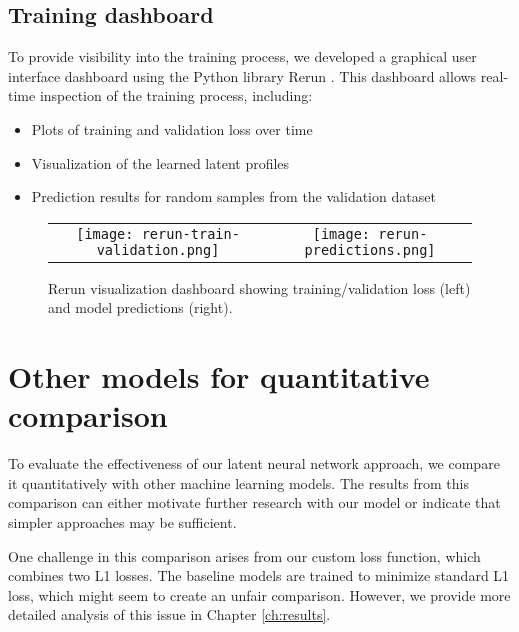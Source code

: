 \subsection{Training dashboard}

To provide visibility into the training process, we developed a graphical user interface dashboard using the Python library Rerun . This dashboard allows real-time inspection of the training process, including:

\begin{itemize}
    \item Plots of training and validation loss over time
    \item Visualization of the learned latent profiles
    \item Prediction results for random samples from the validation dataset
\end{itemize}

\begin{figure}[hb]
    \begin{tabular}{cc}
        \texttt{[image: rerun-train-validation.png]} &
        \texttt{[image: rerun-predictions.png]}
    \end{tabular}
    \caption{Rerun visualization dashboard showing training/validation loss (left) and model predictions (right).}
\end{figure}


\section{Other models for quantitative comparison}

To evaluate the effectiveness of our latent neural network approach, we compare it quantitatively with other machine learning models. The results from this comparison can either motivate further research with our model or indicate that simpler approaches may be sufficient.

One challenge in this comparison arises from our custom loss function, which combines two L1 losses. The baseline models are trained to minimize standard L1 loss, which might seem to create an unfair comparison. However, we provide more detailed analysis of this issue in Chapter \ref{ch:results}.


